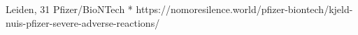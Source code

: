           {
            Leiden, 
          }
          {
            31
          }
          {
            Pfizer/BioNTech
          }
          {
            *
          }
          {
          }
          {
            https://nomoresilence.world/pfizer-biontech/kjeld-nuis-pfizer-severe-adverse-reactions/
          }

